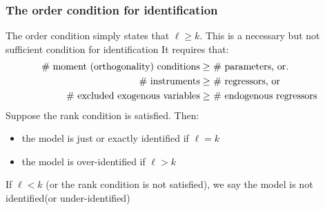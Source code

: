 \documentclass[a4paper,twoside,11pt]{article}
\begin{document}
\subsubsection{The order condition for identification}
The order condition simply states that $\ell \ge k$. This is a necessary but not sufficient condition for identification
\newline
\newline
It requires that:
\begin{equation*}
\begin{aligned}
\# \ \textmd{moment (orthogonality) conditions} \ge& \  \# \  \textmd{parameters, or}. \\
\# \ \textmd{instruments} \ge& \  \# \  \textmd{regressors,  or} \\
\# \ \textmd{excluded exogenous variables} \ge& \  \# \ \textmd{endogenous regressors}
\end{aligned} 
\end{equation*}
Suppose the rank condition is satisfied. Then:
\begin{itemize}
    \item the model is just or exactly identified if $\ell =k$ 
    \item the model is over-identified if $\ell > k$ 
\end{itemize}
If $\ell <k$ (or the rank condition is not satisfied), we say the model is not identified(or under-identified)
\newline
\newline
\end{document}
